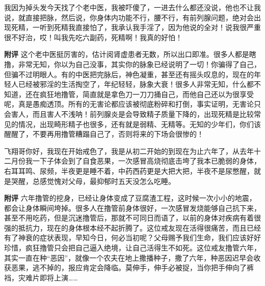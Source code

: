\begin{case}
    我因为掉头发今天找了个老中医，我被吓傻了，一进去什么都还没说，他也不让我说，就直接把脉，然后说，你身体内功能不行，腰不行，有前列腺问题，绝对会出现死精，一听到死精我直接怕了，我承认我手淫了，因为他说的全对！说我很严重很不好治，哎！叫我先吃六副药，死精啊！我真的好怕！

    \textbf{附评} 这个老中医挺厉害的，估计阅肾虚患者无数，所以出口即准。很多人都是瞎撸，非常无知，你以为自己没事，其实你的脉象已经说明了一切！你骗得了自己，但骗不过明眼人。有的中医把完脉后，神色凝重，甚至还有摇头叹息的，现在的年轻人已经被邪淫的生活掏空了，年纪轻轻，脉象大衰！很多人非常无知，什么都不知道，还在疯狂地撸管，简直就是拿色刀一刀刀捅自己，而他自己还以为很享受呢，真是愚痴透顶。所有的无害论都应该被彻底粉碎和打倒，事实证明，无害论只会害人，而且害人不浅呐！前列腺炎是会导致精子质量下降的，出现死精是比较常见的情况，出现畸形精子也很多，还有就是弱精、无精等。无知的少年们，你们该醒醒了，不要再用撸管糟蹋自己了，否则将来的下场会很惨的！
\end{case}

\begin{case}
    飞翔哥你好，我现在开始戒色了，我是从初二开始的到现在为止六年了，从去年十二月份我一下子体会到了自食恶果，一次感冒高烧彻底击垮了我本已脆弱的身体，右耳耳鸣、尿频，半夜更是睡不着，中药西药更是大把大把，半夜不是尿憋醒，就是哭醒，总感觉愧对父母，最抑郁时五天没怎么吃睡。

    \textbf{附评} 六年撸管的挖身，已经让身体变成了豆腐渣工程，这时候一次小小的地震，都会让身体瞬间垮掉。很多人在撸管前身体很好，一次感冒发烧能够自己抗下来，甚至不用吃药，但是沉迷撸管后，那就不可同日而语了，以前的身体对疾病有着很强的抵抗力，现在的身体根本经不起折腾了。这位戒友现在活得很痛苦，而且已经有了神衰的症状表现，早知今日，何必当初呢？父母赐予我们生命，我们应该好好珍惜，疯狂撸管只会把自己逼入绝境，让自己活得生不如死。这位戒友撸管六年，其实一直在种“恶因”，就像一个农夫在地上撒播种子，撒了六年，种恶因迟早会收获恶果，逃不掉的，报应肯定会降临。莫伸手，伸手必被捉，当你把手伸向了裤裆，灾难片即将上演……
\end{case}


